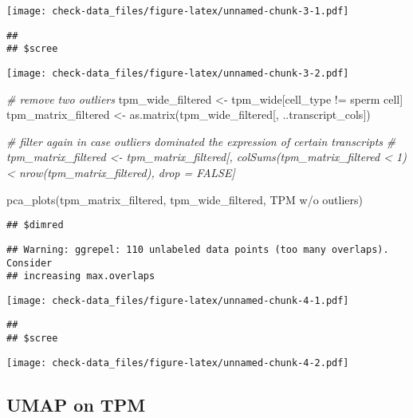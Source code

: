 \documentclass[
]{article}
\newenvironment{Shaded}{\begin{snugshade}}{\end{snugshade}}
\newcommand{\CommentTok}[1]{\textcolor[rgb]{0.56,0.35,0.01}{\textit{#1}}}
\newcommand{\FunctionTok}[1]{\textcolor[rgb]{0.00,0.00,0.00}{#1}}
\newcommand{\NormalTok}[1]{#1}
\newcommand{\OtherTok}[1]{\textcolor[rgb]{0.56,0.35,0.01}{#1}}
\newcommand{\SpecialCharTok}[1]{\textcolor[rgb]{0.00,0.00,0.00}{#1}}
\newcommand{\StringTok}[1]{\textcolor[rgb]{0.31,0.60,0.02}{#1}}
\begin{document}
\texttt{[image: check-data\_files/figure-latex/unnamed-chunk-3-1.pdf]}

\begin{verbatim}
## 
## $scree
\end{verbatim}

\texttt{[image: check-data\_files/figure-latex/unnamed-chunk-3-2.pdf]}

\begin{Shaded}
\begin{Highlighting}[]
\CommentTok{\# remove two outliers}
\NormalTok{tpm\_wide\_filtered }\OtherTok{\textless{}{-}}\NormalTok{ tpm\_wide[cell\_type }\SpecialCharTok{!=} \StringTok{\textquotesingle{}sperm cell\textquotesingle{}}\NormalTok{]}
\NormalTok{tpm\_matrix\_filtered }\OtherTok{\textless{}{-}} \FunctionTok{as.matrix}\NormalTok{(tpm\_wide\_filtered[, ..transcript\_cols])}

\CommentTok{\# filter again in case outliers dominated the expression of certain transcripts}
\CommentTok{\# tpm\_matrix\_filtered \textless{}{-} tpm\_matrix\_filtered[, colSums(tpm\_matrix\_filtered \textless{} 1) \textless{} nrow(tpm\_matrix\_filtered), drop = FALSE]}

\FunctionTok{pca\_plots}\NormalTok{(tpm\_matrix\_filtered, tpm\_wide\_filtered, }\StringTok{\textquotesingle{}TPM w/o outliers\textquotesingle{}}\NormalTok{)}
\end{Highlighting}
\end{Shaded}

\begin{verbatim}
## $dimred
\end{verbatim}

\begin{verbatim}
## Warning: ggrepel: 110 unlabeled data points (too many overlaps). Consider
## increasing max.overlaps
\end{verbatim}

\texttt{[image: check-data\_files/figure-latex/unnamed-chunk-4-1.pdf]}

\begin{verbatim}
## 
## $scree
\end{verbatim}

\texttt{[image: check-data\_files/figure-latex/unnamed-chunk-4-2.pdf]}

\hypertarget{umap-on-tpm}{%
\subsection{UMAP on TPM}\label{umap-on-tpm}}
\end{document}
